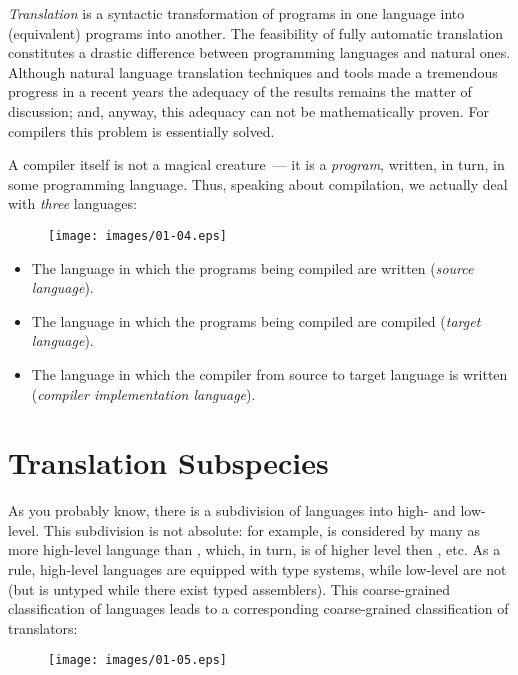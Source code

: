 \emph{Translation} is a syntactic transformation of programs in one language into (equivalent) programs into another.
The feasibility of fully automatic translation constitutes a drastic difference between programming languages and natural ones.
Although natural language translation techniques and tools made a tremendous progress in a recent years the adequacy of the results
remains the matter of discussion; and, anyway, this adequacy can not be mathematically proven. For compilers this problem
is essentially solved.

A compiler itself is not a magical creature~--- it is a \emph{program}, written, in turn, in some programming language. Thus, speaking
about compilation, we actually deal with \emph{three} languages:

\begin{figure}[h]
  \centering
  \texttt{[image: images/01-04.eps]}
\end{figure}

\begin{itemize}
\item The language in which the programs being compiled are written (\emph{source language}).
\item The language in which the programs being compiled are compiled (\emph{target language}).
\item The language in which the compiler from source to target language is written (\emph{compiler implementation language}).
\end{itemize}

\section{Translation Subspecies}

As you probably know, there is a subdivision of languages into high- and low-level. This subdivision is not absolute: for example,
 is considered by many as more high-level language than , which, in turn, is of higher level then , etc.
As a rule, high-level languages are equipped with type systems, while low-level are not (but  is untyped while there
exist typed assemblers). This coarse-grained classification of languages leads to a corresponding coarse-grained classification of
translators:

\begin{figure}[h]
  \centering
  \texttt{[image: images/01-05.eps]}
\end{figure}

